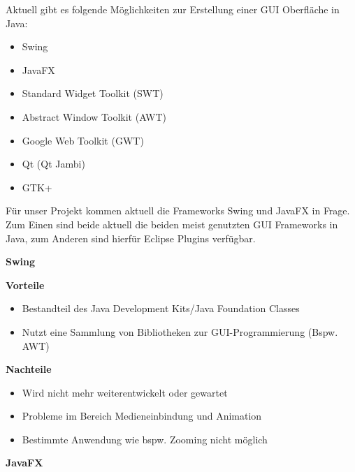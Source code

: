 
Aktuell gibt es folgende Möglichkeiten zur Erstellung einer GUI Oberfläche in Java:
 \begin{itemize}
	\item Swing
	\item JavaFX
	\item Standard Widget Toolkit (SWT)
	\item Abstract Window Toolkit (AWT)
	\item Google Web Toolkit (GWT)
	\item Qt (Qt Jambi)
	\item GTK+
\end{itemize}
\nsecend

Für unser Projekt kommen aktuell die Frameworks Swing und JavaFX in Frage. Zum Einen sind beide aktuell die beiden meist genutzten GUI Frameworks in Java, zum Anderen sind hierfür Eclipse Plugins verfügbar.
\nsecend


\textbf{Swing}

\textbf{Vorteile}
\begin{itemize}
	\item Bestandteil des Java Development Kits/Java Foundation Classes
	\item Nutzt eine Sammlung von Bibliotheken zur GUI-Programmierung (Bspw. AWT)
\end{itemize}


\textbf{Nachteile}
\begin{itemize}
	\item Wird nicht mehr weiterentwickelt oder gewartet
	\item Probleme im Bereich Medieneinbindung und Animation
	\item Bestimmte Anwendung wie bspw. Zooming nicht möglich
\end{itemize}



\nsecend

\textbf{JavaFX}

